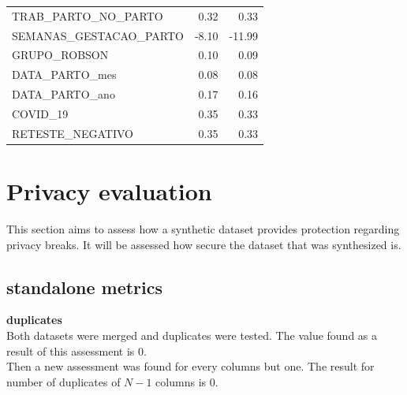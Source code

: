 \documentclass{article}
\begin{document}
\begin{longtable}{lrr}
TRAB\_PARTO\_NO\_PARTO           &            0.32 &            0.33 \\
SEMANAS\_GESTACAO\_PARTO        &           -8.10 &          -11.99 \\
GRUPO\_ROBSON                  &            0.10 &            0.09 \\
DATA\_PARTO\_mes                &            0.08 &            0.08 \\
DATA\_PARTO\_ano                &            0.17 &            0.16 \\
COVID\_19                      &            0.35 &            0.33 \\
RETESTE\_NEGATIVO              &            0.35 &            0.33 \\
\end{longtable}



\section{Privacy evaluation}
This section aims to assess how a synthetic dataset provides protection regarding privacy breaks. It will be assessed how secure the dataset that was synthesized is.
\subsection{standalone metrics}
\textbf{duplicates}\\

Both datasets were merged and duplicates were tested. The value found as a result of this assessment is 0.\\
Then a new assessment was found for every columns but one. The result for number of duplicates of $N-1$ columns is 0. 
\end{document}
